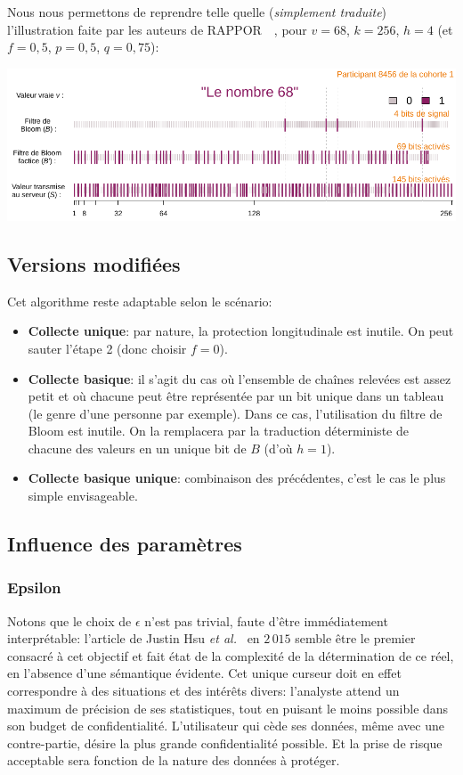 \documentclass[a4paper,11pt]{article} %
\begin{document}
Nous nous permettons de reprendre telle quelle (\emph{simplement traduite}) l'illustration faite par les auteurs de RAPPOR~~\cite{EPK14}, pour $v=68$, $k=256$, $h=4$ (et $f=0,5$, $p=0,5$, $q=0,75$):%
\vspace{-0.3em}
\begin{center}
    \includegraphics[scale=0.78]{schema_RAPPOR.pdf}
\end{center}
%
\subsection{Versions modifiées}
%
Cet algorithme reste adaptable selon le scénario:
\begin{itemize}
    \item 
    \textbf{Collecte unique}: par nature, la protection longitudinale est inutile. On peut sauter l'étape 2 (donc choisir $f=0$).
    \item 
    \textbf{Collecte basique}: il s'agit du cas où l'ensemble de chaînes relevées est assez petit et où chacune peut être représentée par un bit unique dans un tableau (le genre d'une personne par exemple). 
    Dans ce cas, l'utilisation du filtre de Bloom est inutile. 
    On la remplacera par la traduction déterministe de chacune des valeurs en un unique bit de $B$ (d'où $h=1$).
    \item 
    \textbf{Collecte basique unique}: combinaison des précédentes, c'est le cas le plus simple envisageable.
\end{itemize}
%
\subsection{Influence des paramètres}
%
\subsubsection{Epsilon}
%
Notons que le choix de $\epsilon$ n'est pas trivial, faute d'être immédiatement interprétable: l'article de Justin Hsu \textit{et al.}~\cite{HGHK14} en $2\,015$ semble être le premier consacré à cet objectif et fait état de la complexité de la détermination de ce réel, en l'absence d'une sémantique évidente.
Cet unique curseur doit en effet correspondre à des situations et des intérêts divers: l'analyste attend un maximum de précision de ses statistiques, tout en puisant le moins possible dans son \og budget de confidentialité\fg{}. 
L'utilisateur qui cède ses données, même avec une contre-partie, désire la plus grande confidentialité possible. 
Et la prise de risque acceptable sera fonction de la nature des données à protéger. 
\end{document}
